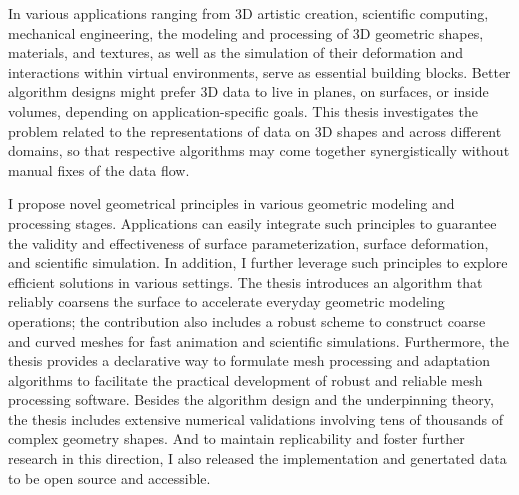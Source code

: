 In various applications ranging from 3D artistic creation, scientific computing, mechanical engineering,
the modeling and processing of 3D geometric shapes, materials, and textures, as well as the simulation of their deformation and interactions within virtual environments, serve as essential building blocks.
Better algorithm designs might prefer 3D data to live in planes, on surfaces, or inside volumes, depending on application-specific goals. 
This thesis investigates the problem related to the representations of data on 3D shapes and across different domains,
so that respective algorithms may come together synergistically without manual fixes of the data flow.

I propose novel geometrical principles in various geometric modeling and processing stages. Applications can easily integrate such principles to guarantee the validity and effectiveness of surface parameterization, surface deformation, and scientific simulation.
In addition, I further leverage such principles to explore efficient solutions in various settings. The thesis introduces an algorithm that reliably coarsens the surface to accelerate everyday geometric modeling operations; the contribution also includes a robust scheme to construct coarse and curved meshes for fast animation and scientific simulations.
Furthermore, the thesis provides a declarative way to formulate mesh processing and adaptation algorithms to facilitate the practical development of robust and reliable mesh processing software.
Besides the algorithm design and the underpinning theory, the thesis includes extensive numerical validations involving tens of thousands of complex geometry shapes. And to maintain replicability and foster further research in this direction, I also released the implementation and genertated data to be open source and accessible.
